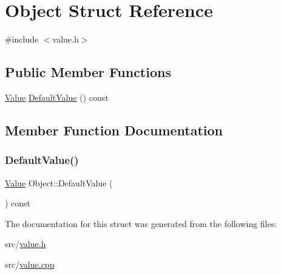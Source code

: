 \hypertarget{struct_object}{}\section{Object Struct Reference}
\label{struct_object}


{\ttfamily \#include $<$value.\+h$>$}

\subsection*{Public Member Functions}
\begin{DoxyCompactItemize}
\item 
\hyperlink{value_8h_a1882706e4f2d631f705767ad4a973ee5}{Value} \hyperlink{struct_object_a57478bff142dccb9f6aa393bf65c1a72}{Default\+Value} () const
\end{DoxyCompactItemize}


\subsection{Member Function Documentation}
\mbox{\label{struct_object_a57478bff142dccb9f6aa393bf65c1a72}} 
\subsubsection{\texorpdfstring{Default\+Value()}{DefaultValue()}}
{\footnotesize\ttfamily \hyperlink{value_8h_a1882706e4f2d631f705767ad4a973ee5}{Value} Object\+::\+Default\+Value (\begin{DoxyParamCaption}{ }\end{DoxyParamCaption}) const}



The documentation for this struct was generated from the following files\+:\begin{DoxyCompactItemize}
\item 
src/\hyperlink{value_8h}{value.\+h}\item 
src/\hyperlink{value_8cpp}{value.\+cpp}\end{DoxyCompactItemize}
